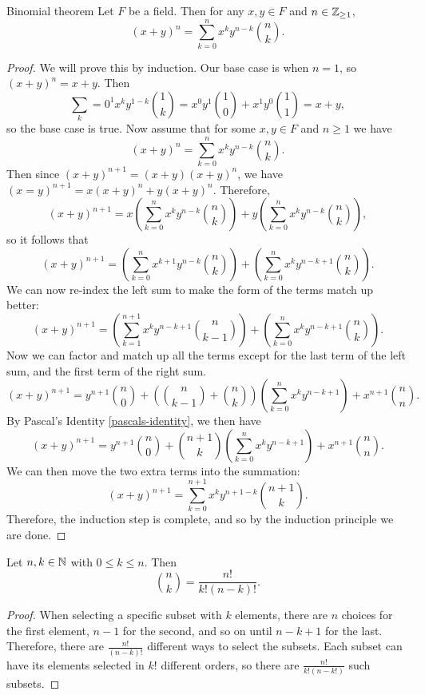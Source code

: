 \begin{thm}{Binomial theorem}\label{binomial-theorem}\proofbreak
    Let $F$ be a field. Then for any $x, y \in F$ and $n \in \mathbb{Z}_{\geq 1}$, \[\left(x + y\right)^n = \sum_{k=0}^n x^ky^{n-k}\binom{n}{k}.\]
\end{thm}

\begin{proof}
    We will prove this by induction. Our base case is when $n = 1$, so $(x + y)^n = x + y$. Then \[\sum_k=0^1x^ky^{1-k}\binom{1}{k} = x^0y^1\binom{1}{0} + x^1y^0\binom{1}{1} = x + y,\] so the base case is true.
    Now assume that for some $x, y \in F$ and $n \geq 1$ we have \[\left(x + y\right)^n = \sum_{k=0}^n x^ky^{n-k}\binom{n}{k}.\] Then since $(x + y)^{n+1} = (x+y)(x+y)^n$, we have $(x = y)^{n+1} = x(x+y)^n + y(x+y)^n$.
    Therefore, \[\left(x + y\right)^{n+1} = x\left(\sum_{k=0}^n x^ky^{n-k}\binom{n}{k}\right) + y\left(\sum_{k=0}^n x^ky^{n-k}\binom{n}{k}\right),\] so it follows that \[\left(x + y\right)^{n+1} = \left(\sum_{k=0}^n x^{k+1}y^{n-k}\binom{n}{k}\right) + \left(\sum_{k=0}^n x^ky^{n-k+1}\binom{n}{k}\right).\]
    We can now re-index the left sum to make the form of the terms match up better: \[\left(x + y\right)^{n+1} = \left(\sum_{k=1}^{n+1} x^{k}y^{n-k+1}\binom{n}{k-1}\right) + \left(\sum_{k=0}^n x^ky^{n-k+1}\binom{n}{k}\right).\]
    Now we can factor and match up all the terms except for the last term of the left sum, and the first term of the right sum.
    \[\left(x + y\right)^{n+1} = y^{n+1}\binom{n}{0} + \left(\binom{n}{k-1} + \binom{n}{k}\right)\left(\sum_{k=0}^{n} x^{k}y^{n-k+1}\right) + x^{n+1}\binom{n}{n}.\]
    By Pascal's Identity \ref{pascals-identity}, we then have
    \[\left(x + y\right)^{n+1} = y^{n+1}\binom{n}{0} + \binom{n+1}{k}\left(\sum_{k=0}^{n} x^{k}y^{n-k+1}\right) + x^{n+1}\binom{n}{n}.\]
    We can then move the two extra terms into the summation:
    \[\left(x + y\right)^{n+1} = \sum_{k=0}^{n+1}x^{k}y^{n+1-k}\binom{n+1}{k}.\]
    Therefore, the induction step is complete, and so by the induction principle we are done.
\end{proof}

\begin{prop}
    Let $n, k \in \mathbb{N}$ with $0 \leq k \leq n$. Then \[\binom{n}{k} = \frac{n!}{k!(n-k)!}.\]
\end{prop}

\begin{proof}
    When selecting a specific subset with $k$ elements, there are $n$ choices for the first element, $n-1$ for the second, and so on until $n-k+1$ for the last. Therefore, there are $\frac{n!}{(n-k)!}$ different ways to select the subsets. Each subset can have its elements selected in $k!$ different orders, so there are $\frac{n!}{k!(n-k!)}$ such subsets.
\end{proof}

